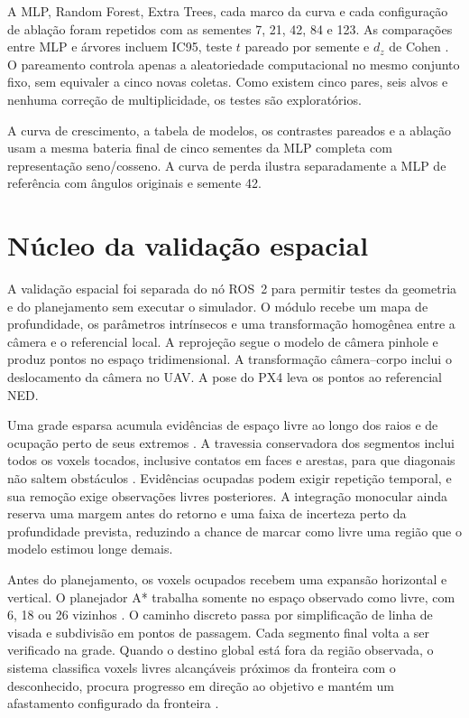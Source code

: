A MLP, Random Forest, Extra Trees, cada marco da curva e cada configuração de ablação foram repetidos com as sementes 7, 21, 42, 84 e 123. As comparações entre MLP e árvores incluem IC95, teste $t$ pareado por semente e $d_z$ de Cohen \cite{Lakens2013}. O pareamento controla apenas a aleatoriedade computacional no mesmo conjunto fixo, sem equivaler a cinco novas coletas. Como existem cinco pares, seis alvos e nenhuma correção de multiplicidade, os testes são exploratórios.

A curva de crescimento, a tabela de modelos, os contrastes pareados e a ablação usam a mesma bateria final de cinco sementes da MLP completa com representação seno/cosseno. A curva de perda ilustra separadamente a MLP de referência com ângulos originais e semente 42.

\section{Núcleo da validação espacial}

A validação espacial foi separada do nó ROS~2 para permitir testes da geometria e do planejamento sem executar o simulador. O módulo recebe um mapa de profundidade, os parâmetros intrínsecos e uma transformação homogênea entre a câmera e o referencial local. A reprojeção segue o modelo de câmera pinhole e produz pontos no espaço tridimensional. A transformação câmera--corpo inclui o deslocamento da câmera no UAV. A pose do PX4 leva os pontos ao referencial NED.

Uma grade esparsa acumula evidências de espaço livre ao longo dos raios e de ocupação perto de seus extremos \cite{Elfes1989,Hornung2013}. A travessia conservadora dos segmentos inclui todos os voxels tocados, inclusive contatos em faces e arestas, para que diagonais não saltem obstáculos \cite{AmanatidesWoo1987}. Evidências ocupadas podem exigir repetição temporal, e sua remoção exige observações livres posteriores. A integração monocular ainda reserva uma margem antes do retorno e uma faixa de incerteza perto da profundidade prevista, reduzindo a chance de marcar como livre uma região que o modelo estimou longe demais.

Antes do planejamento, os voxels ocupados recebem uma expansão horizontal e vertical. O planejador A* trabalha somente no espaço observado como livre, com 6, 18 ou 26 vizinhos \cite{Hart1968}. O caminho discreto passa por simplificação de linha de visada e subdivisão em pontos de passagem. Cada segmento final volta a ser verificado na grade. Quando o destino global está fora da região observada, o sistema classifica voxels livres alcançáveis próximos da fronteira com o desconhecido, procura progresso em direção ao objetivo e mantém um afastamento configurado da fronteira \cite{Yamauchi1997}.

